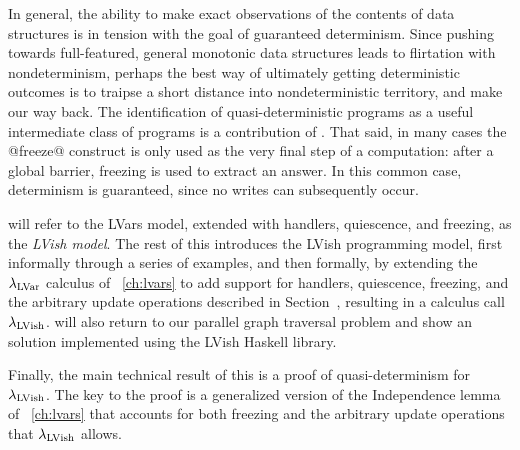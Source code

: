 In general, the ability to make exact observations of the contents of
data structures is in tension with the goal of guaranteed determinism.
Since pushing towards full-featured, general monotonic data structures
leads to flirtation with nondeterminism, perhaps the best way of
ultimately getting deterministic outcomes is to traipse a short
distance into nondeterministic territory, and make our way back.  The
identification of quasi-deterministic programs as a useful
intermediate class of programs is a contribution of .
That said, in many cases the @freeze@ construct is only used as the
very final step of a computation: after a global barrier, freezing is
used to extract an answer.  In this common case, determinism is
guaranteed, since no writes can subsequently occur.

 will refer to the LVars model, extended with handlers, quiescence,
and freezing, as the \emph{LVish model}.  The rest of this  introduces
the LVish programming model, first informally through a series of examples, and then formally, by extending
the $\lambda_{\textrm{LVar}}$ calculus of ~\ref{ch:lvars} to add support
for handlers, quiescence, freezing, and the arbitrary update operations described in
Section~\either{\ref{subsection:lvars-generalizing-from-least-upper-bound-writes}}{\ref{s:lvars-generalizing}}, resulting in a calculus  call $\lambda_{\textrm{LVish}}$.
 will also return to our parallel graph traversal problem and show
an solution implemented using the LVish Haskell library.

Finally, the main technical result of this 
is a proof of quasi-determinism for $\lambda_{\textrm{LVish}}$. The key to the
proof is a generalized version of the Independence lemma
of ~\ref{ch:lvars} that accounts for both
freezing and the arbitrary update operations that $\lambda_{\textrm{LVish}}$
allows.

